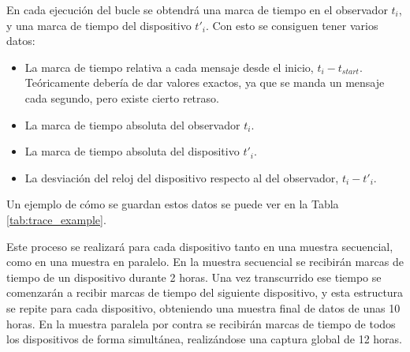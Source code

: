 En cada ejecución del bucle se obtendrá una marca de tiempo en el observador $t_i$, y una marca de tiempo del dispositivo $t'_i$. Con esto se consiguen tener varios datos:
\begin{itemize}
    \item La marca de tiempo relativa a cada mensaje desde el inicio, $t_i - t_{start}$. Teóricamente debería de dar valores exactos, ya que se manda un mensaje cada segundo, pero existe cierto retraso.
    \item La marca de tiempo absoluta del observador $t_i$.
    \item La marca de tiempo absoluta del dispositivo $t'_i$.
    \item La desviación del reloj del dispositivo respecto al del observador, $t_i - t'_i$.
\end{itemize}

Un ejemplo de cómo se guardan estos datos se puede ver en la Tabla \ref{tab:trace_example}.
\begin{table}[htpb!]
    \centering
    \caption{Ejemplo de los datos obtenidos de cada dispositivo}
    \label{tab:trace_example}
\end{table}

Este proceso se realizará para cada dispositivo tanto en una muestra secuencial, como en una muestra en paralelo. En la muestra secuencial se recibirán marcas de tiempo de un dispositivo durante 2 horas. Una vez transcurrido ese tiempo se comenzarán a recibir marcas de tiempo del siguiente dispositivo, y esta estructura se repite para cada dispositivo, obteniendo una muestra final de datos de unas 10 horas. En la muestra paralela por contra se recibirán marcas de tiempo de todos los dispositivos de forma simultánea, realizándose una captura global de 12 horas.


